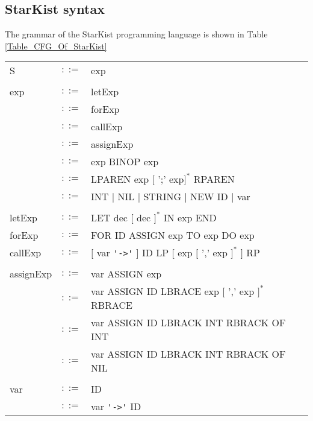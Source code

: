 \documentclass{article}
\begin{document}
\subsection{StarKist syntax}
The grammar of the StarKist programming language is shown in Table \ref{Table_CFG_Of_StarKist}
\begin{table}[h]
\centering
\begin{tabular}{ l c l }
  S                & $::=$ & exp                                                 \\ \\
  exp              & $::=$ & letExp                                              \\
                   & $::=$ & forExp                                              \\
                   & $::=$ & callExp                                             \\
                   & $::=$ & assignExp                                           \\
                   & $::=$ & exp BINOP exp                                       \\
                   & $::=$ & LPAREN exp $[$ ';' exp$]^{*}$ RPAREN                \\
                   & $::=$ & INT $|$ NIL $|$ STRING $|$ NEW ID $|$ var           \\ \\
  letExp           & $::=$ & LET dec $[$ dec $]^{*}$ IN exp END                  \\
  forExp           & $::=$ & FOR ID ASSIGN exp TO exp DO exp                     \\
  callExp          & $::=$ & $[$ var \verb"'->'" $]$ ID LP $[$ exp $[$ ',' exp $]^{*}$ $]$ RP \\ \\
  assignExp        & $::=$ & var ASSIGN exp                                      \\
                   & $::=$ & var ASSIGN ID LBRACE exp $[$ ',' exp $]^{*}$ RBRACE \\
                   & $::=$ & var ASSIGN ID LBRACK INT RBRACK OF INT              \\
                   & $::=$ & var ASSIGN ID LBRACK INT RBRACK OF NIL              \\ \\
  var              & $::=$ & ID                                                  \\
                   & $::=$ & var \verb"'->'" ID                                  \\

\end{tabular}
\end{table}
\end{document}
